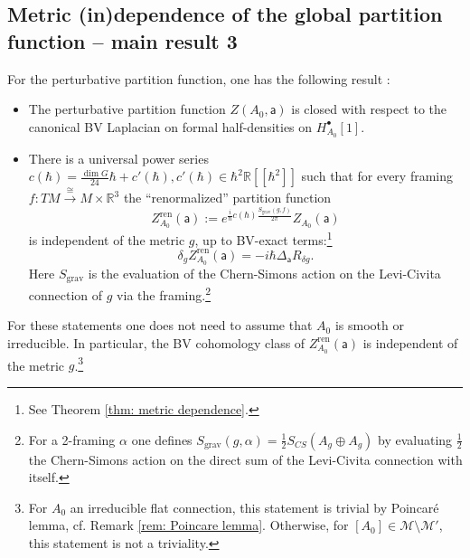 \documentclass[11pt,a4paper]{amsart}
\theoremstyle{plain} %
\theoremstyle{definition}
\theoremstyle{remark}
\newcommand{\R}{\mathbb{R}}
\newcommand{\mr}{\mathrm}
\newcommand{\sfa}{\mathsf{a}}
\newcommand{\M}{\mathcal{M}}
\begin{document}
\subsection{Metric (in)dependence of the global partition function -- main result 3}\label{sec:intro metric}
For the perturbative partition function, one has the following result \cite{Cattaneo2008,mnev2019quantum,Wernli2022}:
\begin{itemize}
    \item The perturbative partition function $Z(A_0,\sfa)$ is closed with respect to the canonical BV Laplacian on formal half-densities on $H^\bullet_{A_0}[1]$. 
    \item There is a universal power series $c(\hbar) = \frac{\dim G}{24}\hbar + c'(\hbar), c'(\hbar)  \in \hbar^2\mathbb{R}[[\hbar^2]]$ such that for every framing $f\colon TM \xrightarrow{\cong} M \times \R^3$ the ``renormalized'' partition function
\begin{equation}
    Z^\mr{ren}_{A_0}(\sfa) := e^{\frac{i}{\hbar}c(\hbar)\frac{S_\mr{grav}(g,f)}{2\pi}}Z_{A_0}(\sfa) \label{eq: renormalization}
\end{equation}
is independent of the metric $g$, up to BV-exact terms:\footnote{ 
See Theorem \ref{thm: metric dependence}.
}
\begin{equation}\label{intro delta_g Z}
    \delta_g Z^\mr{ren}_{A_0}(\sfa)=-i\hbar\Delta_\sfa R_{\delta g}.
\end{equation}
Here $S_\mr{grav}$ is the evaluation of the Chern-Simons action on the Levi-Civita connection of $g$ via the framing.\footnote{For a 2-framing $\alpha$ one defines $S_\mr{grav}({g,\alpha}) =\frac12 S_{CS}(A_g \oplus A_g)$ by evaluating $\frac12$ the Chern-Simons action on the direct sum of the Levi-Civita connection with itself. }
\end{itemize}
For these statements one does not need to assume that $A_0$ is smooth or irreducible.
In particular, the BV cohomology class of $Z^\mr{ren}_{A_0}(\sfa)$ is independent of the metric $g$.\footnote{For $A_0$ an irreducible flat connection, this statement is trivial by Poincar\'e lemma, cf. Remark \ref{rem: Poincare lemma}.   Otherwise, for $[A_0]\in \M\setminus \M'$, this statement is not a triviality.
}
\end{document}
